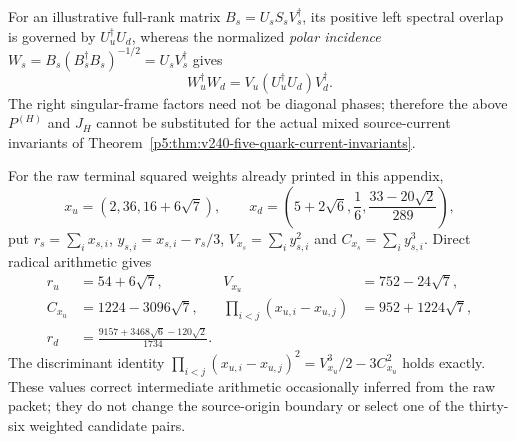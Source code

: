 \documentclass[11pt,a4paper]{article}
\begin{document}
\begin{remark}
For an illustrative full-rank matrix $B_s=U_sS_sV_s^\dagger$,
its positive left spectral overlap is governed by
$U_u^\dagger U_d$, whereas the normalized \emph{polar incidence}
$W_s=B_s(B_s^\dagger B_s)^{-1/2}=U_sV_s^\dagger$ gives
\[
 \boxed{W_u^\dagger W_d
       =V_u(U_u^\dagger U_d)V_d^\dagger.}
\]
The right singular-frame factors need not be diagonal phases;
therefore the above $P^{(H)}$ and $J_H$ cannot be substituted for
the actual mixed source-current invariants of
Theorem~\ref{p5:thm:v240-five-quark-current-invariants}.
\end{remark}
\begin{remark}
\label{p6:rem:v240-raw-quark-packet-corrections}
For the raw terminal squared weights already printed in this appendix,
\[
 x_u=(2,36,16+6\sqrt7),\qquad
 x_d=\left(5+2\sqrt6,\frac16,\frac{33-20\sqrt2}{289}\right),
\]
put $r_s=\sum_i x_{s,i}$, $y_{s,i}=x_{s,i}-r_s/3$,
$V_{x_s}=\sum_i y_{s,i}^2$ and $C_{x_s}=\sum_i y_{s,i}^3$.
Direct radical arithmetic gives
\[
 \boxed{\begin{aligned}
 r_u&=54+6\sqrt7,&V_{x_u}&=752-24\sqrt7,\\
 C_{x_u}&=1224-3096\sqrt7,&
 \prod_{i<j}(x_{u,i}-x_{u,j})&=952+1224\sqrt7,\\
 r_d&=\frac{9157+3468\sqrt6-120\sqrt2}{1734}.
 \end{aligned}}
\]
The discriminant identity
$\prod_{i<j}(x_{u,i}-x_{u,j})^2
=V_{x_u}^3/2-3C_{x_u}^2$ holds exactly.
These values correct intermediate arithmetic occasionally inferred from
the raw packet; they do not change the source-origin boundary or
select one of the thirty-six weighted candidate pairs.
\end{remark}


\end{document}
